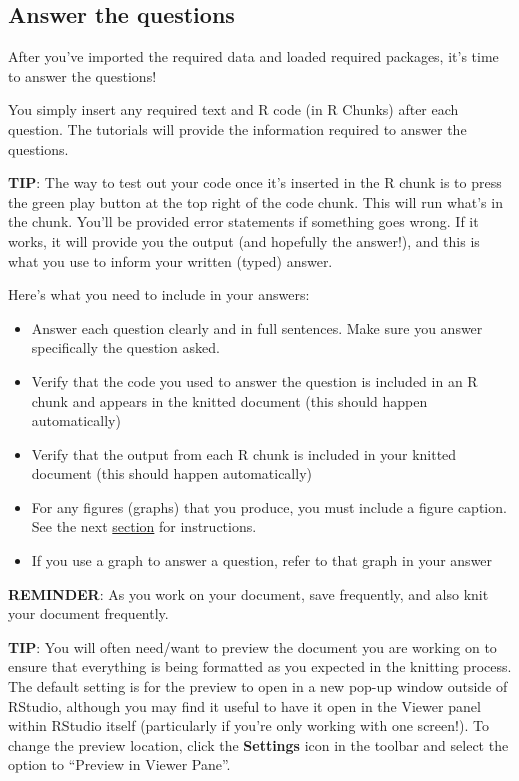 \documentclass[
]{book}
\begin{document}
\subsection{Answer the questions}\label{answer-the-questions}

After you've imported the required data and loaded required packages, it's time to answer the questions!

You simply insert any required text and R code (in R Chunks) after each question. The tutorials will provide the information required to answer the questions.

\textbf{TIP}: The way to test out your code once it's inserted in the R chunk is to press the green play button at the top right of the code chunk. This will run what's in the chunk. You'll be provided error statements if something goes wrong. If it works, it will provide you the output (and hopefully the answer!), and this is what you use to inform your written (typed) answer.

Here's what you need to include in your answers:

\begin{itemize}
\item
  Answer each question clearly and in full sentences. Make sure you answer specifically the question asked.
\item
  Verify that the code you used to answer the question is included in an R chunk and appears in the knitted document (this should happen automatically)
\item
  Verify that the output from each R chunk is included in your knitted document (this should happen automatically)
\item
  For any figures (graphs) that you produce, you must include a figure caption. See the next \hyperref[rmd_graphing]{section} for instructions.
\item
  If you use a graph to answer a question, refer to that graph in your answer
\end{itemize}

\textbf{REMINDER}: As you work on your document, save frequently, and also knit your document frequently.

\textbf{TIP}: You will often need/want to preview the document you are working on to ensure that everything is being formatted as you expected in the knitting process. The default setting is for the preview to open in a new pop-up window outside of RStudio, although you may find it useful to have it open in the Viewer panel within RStudio itself (particularly if you're only working with one screen!). To change the preview location, click the \textbf{Settings} icon in the toolbar and select the option to ``Preview in Viewer Pane''.
\end{document}
